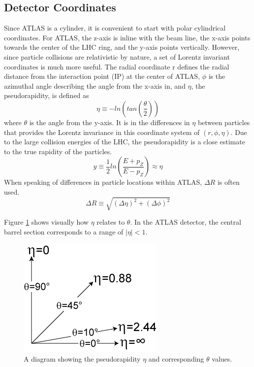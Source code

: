 	\subsection{Detector Coordinates}\label{ssec:coordinates}
	Since ATLAS is a cylinder, it is convenient to start with polar cylindrical coordinates. For ATLAS, the z-axis is inline with the beam line, the x-axis points towards the center of the LHC ring, and the y-axis points vertically. However, since particle collisions are relativistic by nature, a set of Lorentz invariant coordinates is much more useful. The radial coordinate r defines the radial distance from the interaction point (IP) at the center of ATLAS, $\phi$ is the azimuthal angle describing the angle from the x-axis in, and $\eta$, the pseudorapidity, is defined as 
	\begin{equation}\label{eqn:eta}
	\eta \equiv - ln(tan(\frac{\theta}{2}))
	\end{equation}
	where $\theta$ is the angle from the y-axis. It is in the differences in $\eta$ between particles that provides the Lorentz invariance in this coordinate system of $(r,\phi,\eta)$. Due to the large collision energies of the LHC, the pseudorapidity is a close estimate to the true rapidity of the particles. 
	\begin{equation}\label{eqn:rapidity}
	y \equiv \frac{1}{2} ln(\frac{E+p_Z}{E-p_Z}) \approx \eta
	\end{equation}
	When speaking of differences in particle locations within ATLAS, $\Delta R$  is often used.
	\begin{equation}\label{eqn:dR}
	\Delta R \equiv \sqrt{ (\Delta \eta)^2 + (\Delta \phi)^2}
	\end{equation}

	Figure \ref{fig:pseudorapidity} shows visually how $\eta$ relates to $\theta$. In the ATLAS detector, the central barrel section corresponds to a range of $|\eta|<1$. 

	\begin{figure}[!ht]
	\centering
	\includegraphics[width=.25\textwidth,keepaspectratio=true]{chapters/chapter2_experiment/images/Pseudorapidity.png}
	\caption{ A diagram showing the pseudorapidity $\eta$ and corresponding $\theta$ values. \cite{pseudorapidity} }
	\label{fig:pseudorapidity}
	\end{figure}


